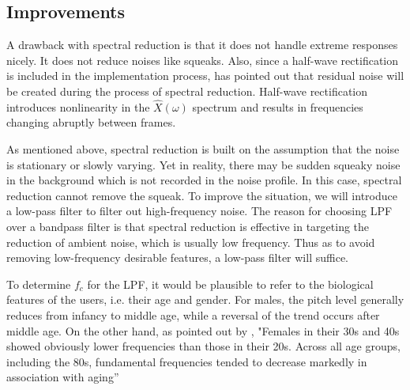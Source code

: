 \subsection{Improvements}
A drawback with spectral reduction is that it does not handle extreme responses nicely. It does not reduce noises like
squeaks. Also, since a half-wave rectification is included in the implementation process, \cite{spectral_drawback} has 
pointed out that residual noise will be created during the process of spectral reduction. Half-wave rectification introduces
nonlinearity in the $\hat{X}(\omega)$ spectrum and results in frequencies changing abruptly between frames.

As mentioned above, spectral reduction is built on the assumption that the noise is stationary or slowly varying. Yet in reality,
there may be sudden squeaky noise in the background which is not recorded in the noise profile. In this case, spectral reduction 
cannot remove the squeak. To improve the situation, we will introduce a low-pass filter to filter out high-frequency noise. The reason
for choosing LPF over a bandpass filter is that spectral reduction is effective in targeting the reduction of ambient noise, which is
 usually low frequency. Thus as to avoid removing low-frequency desirable features, a low-pass filter will suffice.

To determine $f_c$ for the LPF, it would be plausible to refer to the biological features of the users, i.e. their age and gender.
For males, the pitch level generally reduces from infancy to middle age, while a reversal of the trend occurs after middle age. 
On the other hand, as pointed out by \cite{womenprange}, "Females in their 30s and 40s showed obviously lower frequencies than those in their
20s. Across all age groups, including the 80s, fundamental frequencies tended to decrease markedly in association with aging”

